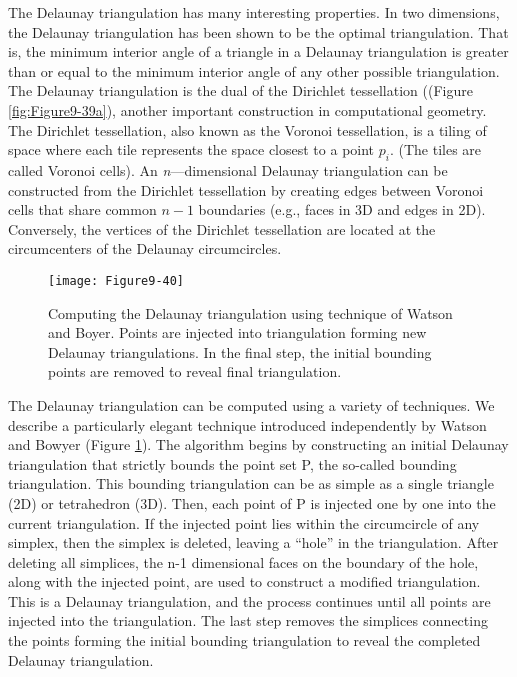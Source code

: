 \begin{description}[leftmargin=0cm,labelindent=0cm]
The Delaunay triangulation has many interesting properties. In two dimensions, the Delaunay triangulation has been shown to be the optimal triangulation. That is, the minimum interior angle of a triangle in a Delaunay triangulation is greater than or equal to the minimum interior angle of any other possible triangulation. The Delaunay triangulation is the dual of the Dirichlet tessellation ((Figure  \ref{fig:Figure9-39a}), another important construction in computational geometry. The Dirichlet tessellation, also known as the Voronoi tessellation, is a tiling of space where each tile represents the space closest to a point $p_i$. (The tiles are called Voronoi cells). An \emph{n}---dimensional Delaunay triangulation can be constructed from the Dirichlet tessellation by creating edges between Voronoi cells that share common $n-1$ boundaries (e.g., faces in 3D and edges in 2D). Conversely, the vertices of the Dirichlet tessellation are located at the circumcenters of the Delaunay circumcircles.

\begin{figure}[!htb]
	\centering
	\texttt{[image: Figure9-40]}
	\caption{Computing the Delaunay triangulation using technique of Watson and Boyer. Points are injected into triangulation forming new Delaunay triangulations. In the final step, the initial bounding points are removed to reveal final triangulation.}
	\label{fig:Figure9-40}
\end{figure}

The Delaunay triangulation can be computed using a variety of techniques. We describe a particularly elegant technique introduced independently by Watson \cite{Watson81} and Bowyer \cite{Bowyer81} (Figure \ref{fig:Figure9-40}). The algorithm begins by constructing an initial Delaunay triangulation that strictly bounds the point set P, the so-called bounding triangulation. This bounding triangulation can be as simple as a single triangle (2D) or tetrahedron (3D). Then, each point of P is injected one by one into the current triangulation. If the injected point lies within the circumcircle of any simplex, then the simplex is deleted, leaving a ``hole'' in the triangulation. After deleting all simplices, the n-1 dimensional faces on the boundary of the hole, along with the injected point, are used to construct a modified triangulation. This is a Delaunay triangulation, and the process continues until all points are injected into the triangulation. The last step removes the simplices connecting the points forming the initial bounding triangulation to reveal the completed Delaunay triangulation.


\end{description}
